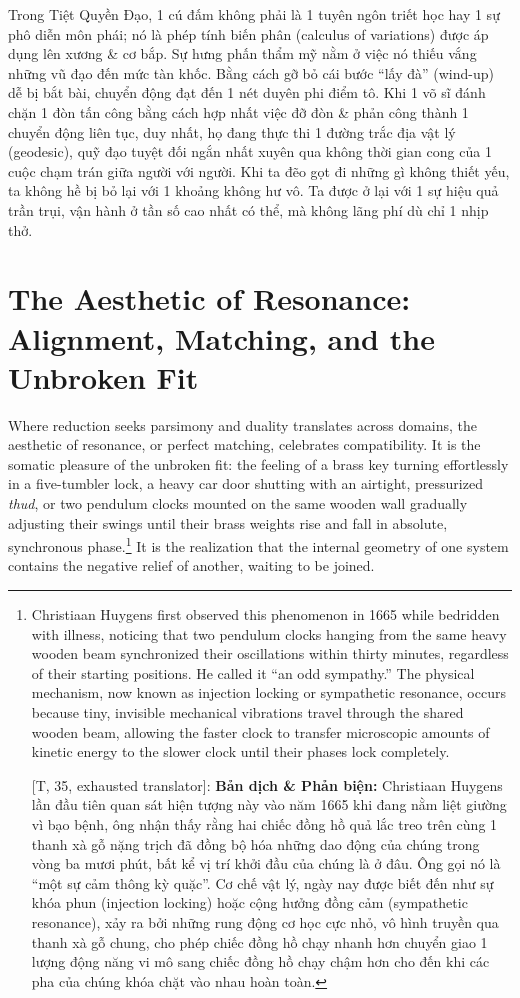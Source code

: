 \documentclass[11pt]{article}
\begin{document}
Trong Tiệt Quyền Đạo, 1 cú đấm không phải là 1 tuyên ngôn triết học hay 1 sự phô diễn môn phái; nó là phép tính biến phân (calculus of variations) được áp dụng lên xương \& cơ bắp. Sự hưng phấn thẩm mỹ nằm ở việc nó thiếu vắng những vũ đạo đến mức tàn khốc. Bằng cách gỡ bỏ cái bước ``lấy đà'' (wind-up) dễ bị bắt bài, chuyển động đạt đến 1 nét duyên phi điểm tô. Khi 1 võ sĩ đánh chặn 1 đòn tấn công bằng cách hợp nhất việc đỡ đòn \& phản công thành 1 chuyển động liên tục, duy nhất, họ đang thực thi 1 đường trắc địa vật lý (geodesic), quỹ đạo tuyệt đối ngắn nhất xuyên qua không thời gian cong của 1 cuộc chạm trán giữa người với người. Khi ta đẽo gọt đi những gì không thiết yếu, ta không hề bị bỏ lại với 1 khoảng không hư vô. Ta được ở lại với 1 sự hiệu quả trần trụi, vận hành ở tần số cao nhất có thể, mà không lãng phí dù chỉ 1 nhịp thở.

\section{The Aesthetic of Resonance: Alignment, Matching, and the Unbroken Fit}
Where reduction seeks parsimony and duality translates across domains, the aesthetic of resonance, or perfect matching, celebrates compatibility. It is the somatic pleasure of the unbroken fit: the feeling of a brass key turning effortlessly in a five-tumbler lock, a heavy car door shutting with an airtight, pressurized \textit{thud}, or two pendulum clocks mounted on the same wooden wall gradually adjusting their swings until their brass weights rise and fall in absolute, synchronous phase.\footnote{Christiaan Huygens first observed this phenomenon in 1665 while bedridden with illness, noticing that two pendulum clocks hanging from the same heavy wooden beam synchronized their oscillations within thirty minutes, regardless of their starting positions. He called it ``an odd sympathy.'' The physical mechanism, now known as injection locking or sympathetic resonance, occurs because tiny, invisible mechanical vibrations travel through the shared wooden beam, allowing the faster clock to transfer microscopic amounts of kinetic energy to the slower clock until their phases lock completely.
	
	\textsf{[T, 35, exhausted translator]:} \textbf{Bản dịch \& Phản biện:} Christiaan Huygens lần đầu tiên quan sát hiện tượng này vào năm 1665 khi đang nằm liệt giường vì bạo bệnh, ông nhận thấy rằng hai chiếc đồng hồ quả lắc treo trên cùng 1 thanh xà gỗ nặng trịch đã đồng bộ hóa những dao động của chúng trong vòng ba mươi phút, bất kể vị trí khởi đầu của chúng là ở đâu. Ông gọi nó là ``một sự cảm thông kỳ quặc''. Cơ chế vật lý, ngày nay được biết đến như sự khóa phun (injection locking) hoặc cộng hưởng đồng cảm (sympathetic resonance), xảy ra bởi những rung động cơ học cực nhỏ, vô hình truyền qua thanh xà gỗ chung, cho phép chiếc đồng hồ chạy nhanh hơn chuyển giao 1 lượng động năng vi mô sang chiếc đồng hồ chạy chậm hơn cho đến khi các pha của chúng khóa chặt vào nhau hoàn toàn.} It is the realization that the internal geometry of one system contains the negative relief of another, waiting to be joined.
\end{document}
